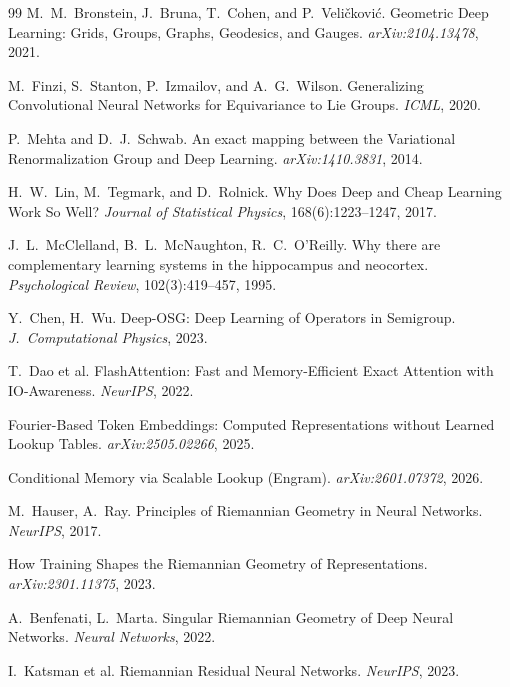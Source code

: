 \documentclass[11pt, a4paper]{article}
\theoremstyle{remark}
\begin{document}
\begin{thebibliography}{99}
M.~M.~Bronstein, J.~Bruna, T.~Cohen, and P.~Veli{\v{c}}kovi{\'c}.
\newblock Geometric Deep Learning: Grids, Groups, Graphs, Geodesics, and Gauges.
\newblock \emph{arXiv:2104.13478}, 2021.

M.~Finzi, S.~Stanton, P.~Izmailov, and A.~G.~Wilson.
\newblock Generalizing Convolutional Neural Networks for Equivariance to Lie Groups.
\newblock \emph{ICML}, 2020.

P.~Mehta and D.~J.~Schwab.
\newblock An exact mapping between the Variational Renormalization Group and Deep Learning.
\newblock \emph{arXiv:1410.3831}, 2014.

H.~W.~Lin, M.~Tegmark, and D.~Rolnick.
\newblock Why Does Deep and Cheap Learning Work So Well?
\newblock \emph{Journal of Statistical Physics}, 168(6):1223--1247, 2017.

J.~L.~McClelland, B.~L.~McNaughton, R.~C.~O'Reilly.
\newblock Why there are complementary learning systems in the hippocampus and neocortex.
\newblock \emph{Psychological Review}, 102(3):419--457, 1995.

Y.~Chen, H.~Wu.
\newblock Deep-OSG: Deep Learning of Operators in Semigroup.
\newblock \emph{J.\ Computational Physics}, 2023.

T.~Dao et al.
\newblock FlashAttention: Fast and Memory-Efficient Exact Attention with IO-Awareness.
\newblock \emph{NeurIPS}, 2022.

Fourier-Based Token Embeddings: Computed Representations without Learned Lookup Tables. \emph{arXiv:2505.02266}, 2025.

Conditional Memory via Scalable Lookup (Engram). \emph{arXiv:2601.07372}, 2026.

M.~Hauser, A.~Ray.
\newblock Principles of Riemannian Geometry in Neural Networks.
\newblock \emph{NeurIPS}, 2017.

How Training Shapes the Riemannian Geometry of Representations. \emph{arXiv:2301.11375}, 2023.

A.~Benfenati, L.~Marta.
\newblock Singular Riemannian Geometry of Deep Neural Networks.
\newblock \emph{Neural Networks}, 2022.

I.~Katsman et al.
\newblock Riemannian Residual Neural Networks.
\newblock \emph{NeurIPS}, 2023.


\end{thebibliography}
\end{document}
